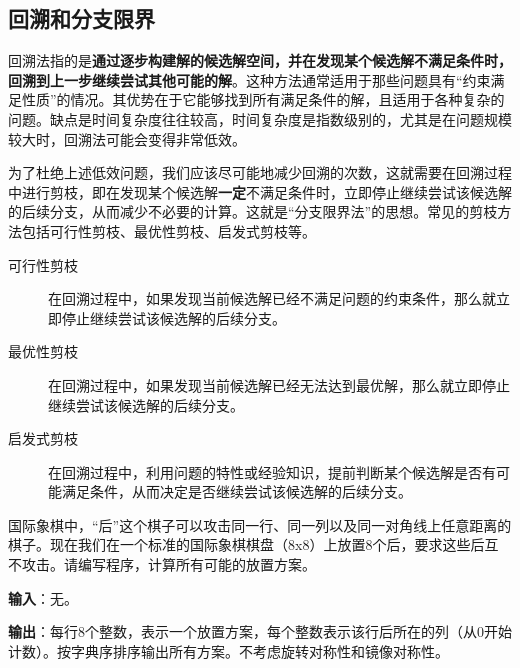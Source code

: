\subsection{回溯和分支限界}

回溯法指的是\textbf{通过逐步构建解的候选解空间，并在发现某个候选解不满足条件时，回溯到上一步继续尝试其他可能的解}。这种方法通常适用于那些问题具有“约束满足性质”的情况。其优势在于它能够找到所有满足条件的解，且适用于各种复杂的问题。缺点是时间复杂度往往较高，时间复杂度是指数级别的，尤其是在问题规模较大时，回溯法可能会变得非常低效。

为了杜绝上述低效问题，我们应该尽可能地减少回溯的次数，这就需要在回溯过程中进行剪枝，即在发现某个候选解\textbf{一定}不满足条件时，立即停止继续尝试该候选解的后续分支，从而减少不必要的计算。这就是“分支限界法”的思想。常见的剪枝方法包括可行性剪枝、最优性剪枝、启发式剪枝等。

\begin{description}
    \item[可行性剪枝] 在回溯过程中，如果发现当前候选解已经不满足问题的约束条件，那么就立即停止继续尝试该候选解的后续分支。
    \item[最优性剪枝] 在回溯过程中，如果发现当前候选解已经无法达到最优解，那么就立即停止继续尝试该候选解的后续分支。
    \item[启发式剪枝] 在回溯过程中，利用问题的特性或经验知识，提前判断某个候选解是否有可能满足条件，从而决定是否继续尝试该候选解的后续分支。
\end{description}

\begin{example}
    国际象棋中，“后”这个棋子可以攻击同一行、同一列以及同一对角线上任意距离的棋子。现在我们在一个标准的国际象棋棋盘（8x8）上放置8个后，要求这些后互不攻击。请编写程序，计算所有可能的放置方案。

    \textbf{输入}：无。

    \textbf{输出}：每行8个整数，表示一个放置方案，每个整数表示该行后所在的列（从0开始计数）。按字典序排序输出所有方案。不考虑旋转对称性和镜像对称性。
\end{example}

